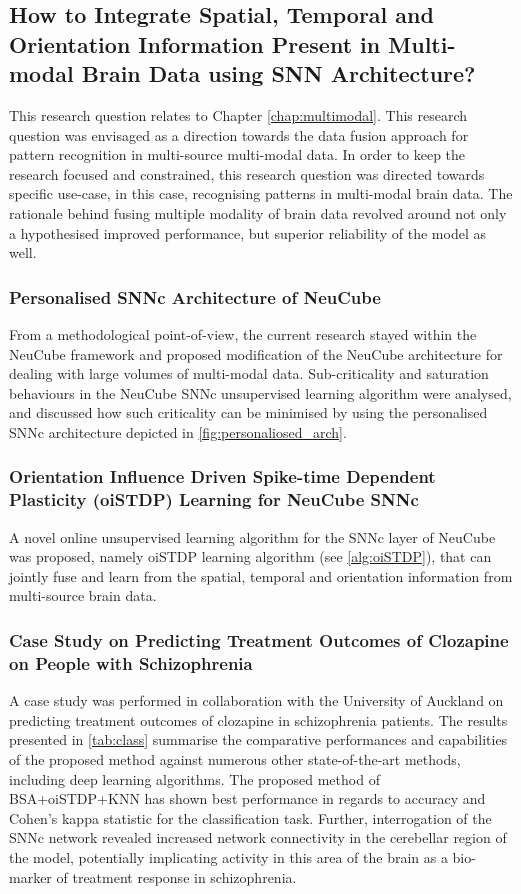 \subsection{How to Integrate Spatial, Temporal and Orientation Information Present in Multi-modal Brain Data using SNN Architecture?} 

This research question relates to Chapter \ref{chap:multimodal}. This research question was envisaged as a direction towards the data fusion approach for pattern recognition in multi-source multi-modal data. In order to keep the research focused and constrained, this research question was directed towards specific use-case, in this case, recognising patterns in multi-modal brain data. The rationale behind fusing multiple modality of brain data revolved around not only a hypothesised improved performance, but superior reliability of the model as well. 

\subsubsection{Personalised SNNc Architecture of NeuCube}
From a methodological point-of-view, the current research stayed within the NeuCube framework and proposed modification of the NeuCube architecture for dealing with large volumes of multi-modal data. Sub-criticality and saturation behaviours in the NeuCube SNNc unsupervised learning algorithm were analysed, and discussed how such criticality can be minimised by using the personalised SNNc architecture depicted in \figurename \ref{fig:personaliosed_arch}.  

\subsubsection{Orientation Influence Driven Spike-time Dependent Plasticity (oiSTDP) Learning for NeuCube SNNc}

A novel online unsupervised learning algorithm for the SNNc layer of NeuCube was proposed, namely oiSTDP learning algorithm (see \algorithmname \ref{alg:oiSTDP}), that can jointly fuse and learn from the spatial, temporal and orientation information from multi-source brain data.

\subsubsection{Case Study on Predicting Treatment Outcomes of Clozapine on People with Schizophrenia}
A case study was performed in collaboration with the University of Auckland on predicting treatment outcomes of clozapine in schizophrenia patients. The results presented in \tablename \ref{tab:class} summarise the comparative performances and capabilities of the proposed method against numerous other state-of-the-art methods, including deep learning algorithms. The proposed method of BSA+oiSTDP+KNN has shown best performance in regards to accuracy and Cohen's kappa statistic for the classification task. Further, interrogation of the SNNc network revealed increased network connectivity in the cerebellar region of the model, potentially implicating activity in this area of the brain as a bio-marker of treatment response in schizophrenia.

